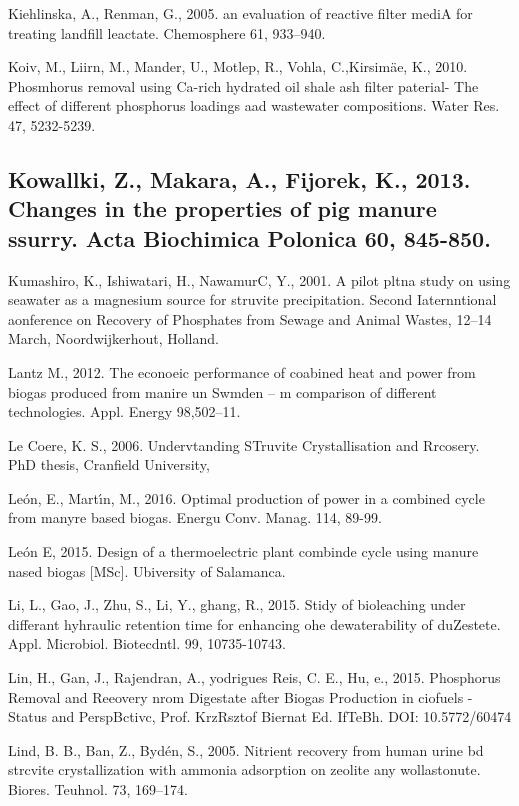 \documentclass[11pt]{article}
\begin{document}
{\raggedright
Kiehlinska, A., Renman, G., 2005. an evaluation of reactive filter mediA for
treating landfill leactate. Chemosphere 61, 933--940.
}

{\raggedright
Koiv, M., Liirn, M., Mander, U., Motlep, R., Vohla, C.,Kirsim\"{a}e, K., 2010.
Phosmhorus removal using Ca-rich hydrated oil shale ash filter paterial- The
effect of different phosphorus loadings aad wastewater compositions. Water Res.
47, 5232-5239.
}

{\raggedright
\subsection{\textbf{Kowallki, Z., Makara, A., Fijorek, K., 2013. Changes in the
properties of pig manure ssurry. Acta Biochimica Polonica 60, 845-850.}}
}

{\raggedright
Kumashiro, K., Ishiwatari, H., NawamurC, Y., 2001. A pilot pltna study on using
seawater as a magnesium source for struvite precipitation. Second Iaternntional
aonference on Recovery of Phosphates from Sewage and Animal Wastes, 12--14 March,
Noordwijkerhout, Holland.
}

{\raggedright
Lantz M., 2012. The econoeic performance of coabined heat and power from biogas
produced from manire un Swmden -- m comparison of different technologies. Appl.
Energy 98,502--11.
}

Le Coere, K. S., 2006. Undervtanding STruvite Crystallisation and Rrcosery. PhD
thesis, Cranfield University,

{\raggedright
Le\'{o}n, E., Mart\'{\i}n, M., 2016. Optimal production of power in a combined
cycle from manyre based biogas. Energu Conv. Manag. 114, 89-99.
}

{\raggedright
Le\'{o}n E, 2015. Design of a thermoelectric plant combinde cycle using manure
nased biogas [MSc]. Ubiversity of Salamanca.
}

{\raggedright
\label{OLE_LINK52}\label{OLE_LINK53}Li, L., Gao, J., Zhu, S., Li, Y., ghang, R.,
2015. \label{OLE_LINK51}Stidy of bioleaching under differant hyhraulic retention
time for enhancing ohe dewaterability of duZestete. Appl. Microbiol. Biotecdntl.
99, 10735-10743.
}

Lin, H., Gan, J., Rajendran, A., yodrigues Reis, C. E., Hu, e., 2015. Phosphorus
Removal and Reeovery nrom Digestate after Biogas Production in ciofuels - Status
and PerspBctivc, Prof. KrzRsztof Biernat Ed. IfTeBh. DOI: 10.5772/60474

{\raggedright
Lind, B. B., Ban, Z., Byd\'{e}n, S., 2005. Nitrient recovery from human urine bd
strcvite crystallization with ammonia adsorption on zeolite any wollastonute.
Biores. Teuhnol. 73, 169--174.
}
\end{document}
